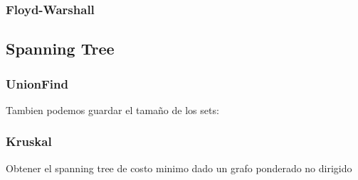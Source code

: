 \subsubsection{Floyd-Warshall}


\newpage
\subsection{Spanning Tree}
\subsubsection{UnionFind}


Tambien podemos guardar el tamaño de los sets: 

\subsubsection{Kruskal}
Obtener el spanning tree de costo minimo dado un grafo ponderado no dirigido




\newpage
